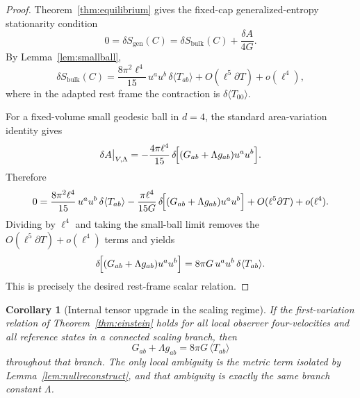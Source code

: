 \documentclass[11pt]{article}
\newtheorem{corollary}[theorem]{Corollary}
\begin{document}
\begin{proof}
Theorem~\ref{thm:equilibrium} gives the fixed-cap generalized-entropy stationarity condition
\[
0=\delta S_{\mathrm{gen}}(C)
=
\delta S_{\mathrm{bulk}}(C)+\frac{\delta A}{4G}.
\]
By Lemma~\ref{lem:smallball},
\[
\delta S_{\mathrm{bulk}}(C)
=
\frac{8\pi^2\ell^4}{15}\,u^a u^b\,\delta\langle T_{ab}\rangle
+O(\ell^5\partial T)+o(\ell^4),
\]
where in the adapted rest frame the contraction is $\delta\langle T_{00}\rangle$.

For a fixed-volume small geodesic ball in $d=4$, the standard area-variation identity gives
\[
\delta A\big|_{V,\Lambda}
=
-\frac{4\pi\ell^4}{15}\,
\delta\!\Bigl[(G_{ab}+\Lambda g_{ab})u^a u^b\Bigr].
\]
Therefore
\[
0
=
\frac{8\pi^2\ell^4}{15}\,u^a u^b\,\delta\langle T_{ab}\rangle
-\frac{\pi\ell^4}{15G}\,
\delta\!\Bigl[(G_{ab}+\Lambda g_{ab})u^a u^b\Bigr]
+O(\ell^5\partial T)+o(\ell^4).
\]
Dividing by $\ell^4$ and taking the small-ball limit removes the $O(\ell^5\partial T)+o(\ell^4)$ terms and yields
\[
\delta\!\Bigl[(G_{ab}+\Lambda g_{ab})u^a u^b\Bigr]
=
8\pi G\,u^a u^b\,\delta\langle T_{ab}\rangle.
\]
This is precisely the desired rest-frame scalar relation.
\end{proof}

\begin{corollary}[Internal tensor upgrade in the scaling regime]\label{cor:einstein}
If the first-variation relation of Theorem~\ref{thm:einstein} holds for all local observer four-velocities and all reference states in a connected scaling branch, then
\[
G_{ab}+\Lambda g_{ab}=8\pi G\,\langle T_{ab}\rangle
\]
throughout that branch. The only local ambiguity is the metric term isolated by Lemma~\ref{lem:nullreconstruct}, and that ambiguity is exactly the same branch constant $\Lambda$.
\end{corollary}
\end{document}
